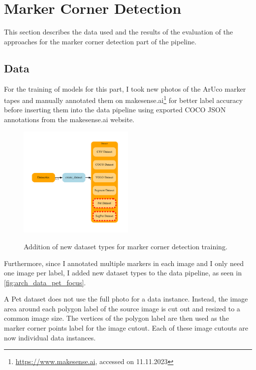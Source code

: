 \documentclass[10pt]{book}
\newcommand{\figureref}[1]{\autoref{#1}}
\begin{document}
\section{Marker Corner Detection}

This section describes the data used and the results of the evaluation of the approaches for the marker corner detection part of the pipeline.

\subsection{Data}

For the training of models for this part, I took new photos of the \ac{ArUco} marker tapes and manually annotated them on makesense.ai\footnote{\url{https://www.makesense.ai}, accessed on 11.11.2023} for better label accuracy before inserting them into the data pipeline using exported \ac{COCO} \ac{JSON} annotations from the makesense.ai website.

\begin{figure}
  \caption{Addition of new dataset types for marker corner detection training.}
  \includegraphics[width=0.5\textwidth]{graph/arch_data_pet_focus}
  \label{fig:arch_data_pet_focus}
\end{figure}

Furthermore, since I annotated multiple markers in each image and I only need one image per label, I added new dataset types to the data pipeline, as seen in \figureref{fig:arch_data_pet_focus}. 

A Pet dataset does not use the full photo for a data instance. Instead, the image area around each polygon label of the source image is cut out and resized to a common image size. The vertices of the polygon label are then used as the marker corner points label for the image cutout. Each of these image cutouts are now individual data instances.
\end{document}

